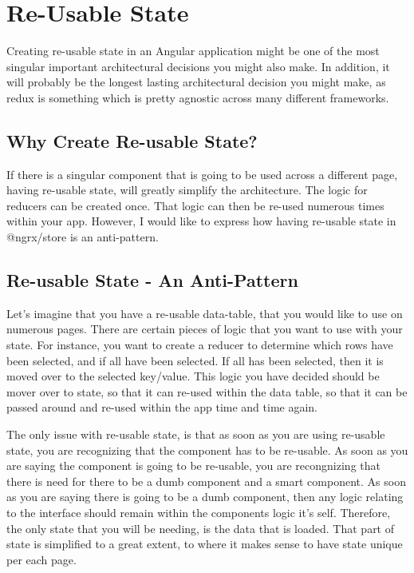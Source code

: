 \maketitle{}
\section{ Re-Usable State }

Creating re-usable state in an Angular application might be one of the most
singular important architectural decisions you might also make. In addition, it
will probably be the longest lasting architectural decision you might make, as
redux is something which is pretty agnostic across many different frameworks.

\subsection{Why Create Re-usable State?}
If there is a singular component that is going to be used across a different
page, having re-usable state, will greatly simplify the architecture. The
logic for reducers can be created once. That logic can then be re-used numerous
times within your app. However, I would like to express how having re-usable
state in @ngrx/store is an anti-pattern.

\subsection{Re-usable State - An Anti-Pattern}
Let's imagine that you have a re-usable data-table, that you would like to use
on numerous pages. There are certain pieces of logic that you want to use with
your state. For instance, you want to create a reducer to determine which
rows have been selected, and if all have been selected. If all has been
selected, then it is moved over to the selected key/value. This logic you have
decided should be mover over to state, so that it can re-used within the data
table, so that it can be passed around and re-used within the app time and time
again.

The only issue with re-usable state, is that as soon as you are using re-usable
state, you are recognizing that the component has to be re-usable. As soon as
you are saying the component is going to be re-usable, you are recongnizing
that there is need for there to be a dumb component and a smart component. As
soon as you are saying there is going to be a dumb component, then any logic
relating to the interface should remain within the components logic it's self.
Therefore, the only state that you will be needing, is the data that is loaded.
That part of state is simplified to a great extent, to where it makes sense to
have state unique per each page. 
